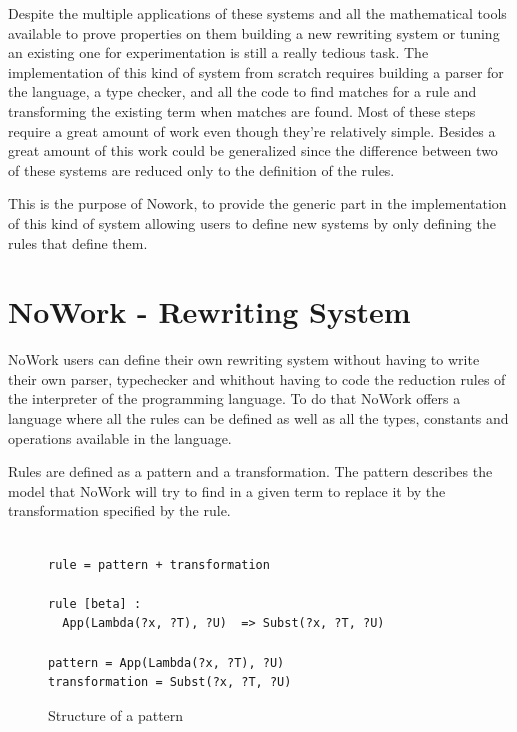 \documentclass[12pt,a4paper]{article}
\begin{document}
Despite the multiple applications of these systems and all the
mathematical tools available to prove properties on them building a
new rewriting system or tuning an existing one for experimentation is
still a really tedious task. The implementation of this kind of
system from scratch requires building a parser for the language, a
type checker, and all the code to find matches for a rule and
transforming the existing term when matches are found. Most of these
steps require a great amount of work even though they're relatively
simple. Besides a great amount of this work could be generalized since
the difference between two of these systems are reduced only to the
definition of the rules.

This is the purpose of Nowork, to provide the generic part in the
implementation of this kind of system allowing users to define new
systems by only defining the rules that define them.



\section{ NoWork - Rewriting System }

NoWork users can define their own rewriting system without having to
write their own parser, typechecker and whithout having to code the
reduction rules of the interpreter of the programming language. To do
that NoWork offers a language where all the rules can be defined as
well as all the types, constants and operations available in the
language.

Rules are defined as a pattern  and a transformation. The pattern
describes the model that NoWork will try to find in a given term
to replace it by the transformation specified by the rule.

\begin{figure}[!h]
\begin{center}
\begin{verbatim}

rule = pattern + transformation

rule [beta] :
  App(Lambda(?x, ?T), ?U)  => Subst(?x, ?T, ?U)

pattern = App(Lambda(?x, ?T), ?U) 
transformation = Subst(?x, ?T, ?U)

\end{verbatim}
\end{center}
\caption{Structure of a pattern}
\end{figure}
\end{document}
